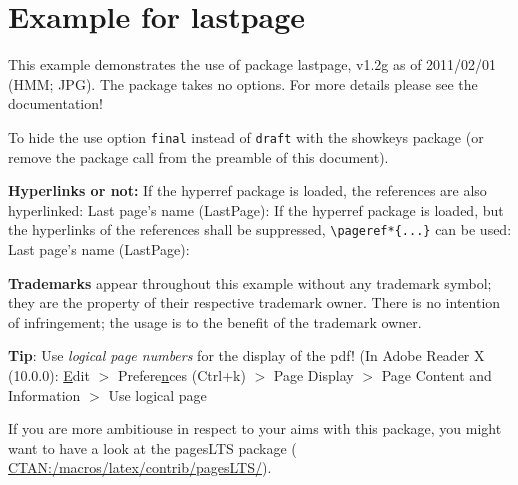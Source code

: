 \documentclass[british]{article}
\begin{document}

\section*{Example for lastpage}

This example demonstrates the use of package\newline
\textsf{lastpage}, v1.2g as of 2011/02/01 (HMM; JPG).\newline
The package takes no options.\newline
For more details please see the documentation!\newline

\noindent \label{keys} To hide the \pageref{keys}{\qquad } use option
\texttt{final} instead of \texttt{draft} with the \textsf{showkeys}
package (or remove the package call from the preamble of
this document).\newline

\textbf{Hyperlinks or not:} If the \textsf{hyperref} package is loaded,
the references are also hyperlinked:\newline
\smallskip
Last page's name (LastPage): \pageref{LastPage}\newline
\noindent If the \textsf{hyperref} package is loaded, but the hyperlinks
of the references shall be suppressed, \texttt{\textbackslash pageref*\{...\}}
can be used:\newline
\smallskip
Last page's name (LastPage): \pageref*{LastPage}\newline

\textbf{Trademarks} appear throughout this example without any
trademark symbol; they are the property of their respective
trademark owner. There is no intention of infringement; the
usage is to the benefit of the trademark owner.\newline

\textbf{Tip}: Use \textit{logical page numbers} for
the display of the pdf!\newline
(In Adobe Reader X (10.0.0): \underline{E}dit $>$
Prefere\underline{n}ces (Ctrl+k) $>$ Page Display $>$
Page Content and Information $>$ Use logical page
\newline

If you are more ambitiouse in respect to your aims with this package,
you might want to have a look at the \textsf{pagesLTS} package\newline
(\href{http://www.ctan.org/tex-archive/macros/latex/contrib/pagesLTS/}{%
CTAN:/macros/latex/contrib/pagesLTS/}).
\end{document}
